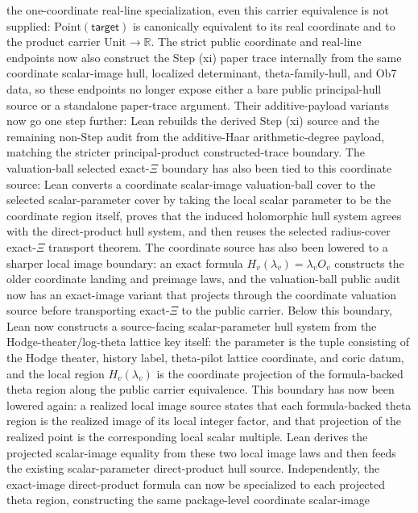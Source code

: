 \documentclass[11pt]{article}
\theoremstyle{plain}
\theoremstyle{definition}
\theoremstyle{remark}
\begin{document}
the one-coordinate real-line specialization, even this carrier equivalence is
not supplied: \(\mathrm{Point}(\mathsf{target})\) is canonically equivalent to
its real coordinate and to the product carrier \(\mathrm{Unit}\to\mathbb R\).
The strict public coordinate and real-line endpoints now also construct the
Step (xi) paper trace internally from the same coordinate scalar-image hull,
localized determinant, theta-family-hull, and Ob7 data, so these endpoints no
longer expose either a bare public principal-hull source or a standalone
paper-trace argument.  Their additive-payload variants now go one step further:
Lean rebuilds the derived Step (xi) source and the remaining non-Step audit
from the additive-Haar arithmetic-degree payload, matching the stricter
principal-product constructed-trace boundary.
The valuation-ball selected exact-\(\Xi\) boundary has also been tied to this
coordinate source: Lean converts a coordinate scalar-image valuation-ball
cover to the selected scalar-parameter cover by taking the local scalar
parameter to be the coordinate region itself, proves that the induced
holomorphic hull system agrees with the direct-product hull system, and then
reuses the selected radius-cover exact-\(\Xi\) transport theorem.
The coordinate source has also been lowered to a sharper local image
boundary: an exact formula \(H_v(\lambda_v)=\lambda_v O_v\) constructs the
older coordinate landing and preimage laws, and the valuation-ball public
audit now has an exact-image variant that projects through the coordinate
valuation source before transporting exact-\(\Xi\) to the public carrier.
Below this boundary, Lean now constructs a source-facing scalar-parameter
hull system from the Hodge-theater/log-theta lattice key itself: the parameter
is the tuple consisting of the Hodge theater, history label, theta-pilot
lattice coordinate, and coric datum, and the local region \(H_v(\lambda_v)\)
is the coordinate projection of the formula-backed theta region along the
public carrier equivalence.  This boundary has now been lowered again: a
realized local image source states that each formula-backed theta region is
the realized image of its local integer factor, and that projection of the
realized point is the corresponding local scalar multiple.  Lean derives the
projected scalar-image equality from these two local image laws and then feeds
the existing scalar-parameter direct-product hull source.  Independently, the
exact-image direct-product formula can now be specialized to each projected
theta region, constructing the same package-level coordinate scalar-image
\end{document}
